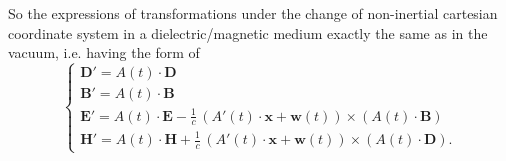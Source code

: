 \documentclass{article}
\theoremstyle{definition}
\theoremstyle{remark}
\renewcommand{\vec}[1]{\mathbf{#1}}
\begin{document}
So the expressions of transformations under the change of
non-inertial cartesian coordinate system in a dielectric/magnetic
medium exactly the same as in the vacuum, i.e. having the form of
\begin{equation}\label{guigikvbvbggjklhjkkgjgGGGG}
\begin{cases}
\vec D'=A(t)\cdot \vec D\\
\vec B'=A(t)\cdot\vec B\\
\vec E'=A(t)\cdot\vec E-\frac{1}{c}\,\left(A'(t)\cdot\vec x+\vec
w(t)\right)\times \left(A(t)\cdot\vec B\right)\\
\vec H'=A(t)\cdot\vec H+\frac{1}{c}\,\left(A'(t)\cdot\vec x+\vec
w(t)\right)\times \left(A(t)\cdot\vec D\right).
\end{cases}
\end{equation}
\end{document}
